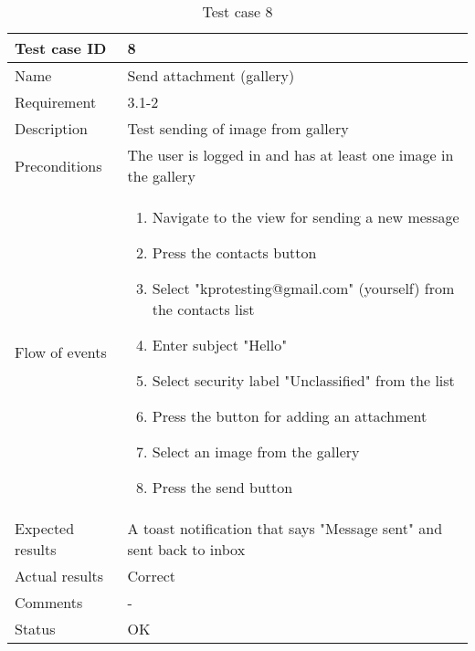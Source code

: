 		\begin{table}
			\begin{tabular}{l|p{10cm}}
				Test case ID & 8 \\ \hline
				Name & Send attachment (gallery)\\ \hline
				Requirement & 3.1-2\\ \hline
				Description & Test sending of image from gallery\\ \hline
				Preconditions & The user is logged in and has at least one image in the gallery\\ \hline
				Flow of events & 
					\begin{enumerate}
						\item{}Navigate to the view for sending a new message
						\item{}Press the contacts button
						\item{}Select "kprotesting@gmail.com" (yourself) from the contacts list
						\item{}Enter subject "Hello"
						\item{}Select security label "Unclassified" from the list
						\item{}Press the button for adding an attachment
						\item{}Select an image from the gallery
						\item{}Press the send button
					\end{enumerate} \\ \hline
				Expected results & A toast notification that says "Message sent" and sent back to inbox\\ \hline
				Actual results & Correct\\ \hline
				Comments & -\\ \hline
				Status &OK \\ \hline
			\end{tabular}
			\caption{Test case 8} \label{tab:case8}
		\end{table}

